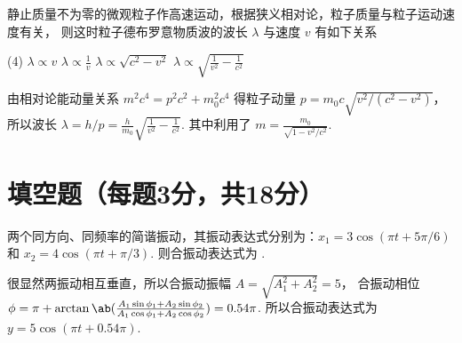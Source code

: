 \documentclass[quiet]{ctexart}
\begin{document}
\begin{problem}
  静止质量不为零的微观粒子作高速运动，根据狭义相对论，粒子质量与粒子运动速度有关，
  则这时粒子德布罗意物质波的波长 $\lambda$ 与速度 $v$ 有如下关系
  \begin{tasks}(4)
    \task $\lambda \propto v$
    \task $\lambda \propto \frac1v$
    \task $\lambda \propto \sqrt{c^2 - v^2}$
    \task[\true] $\lambda \propto \sqrt{\frac1{v^2} - \frac1{c^2}}$
  \end{tasks}
\end{problem}
\begin{solution}
  由相对论能动量关系 $m^2c^4 = p^2c^2 + m_0^2c^4$ 得粒子动量
  $p = m_0c \sqrt{v^2/(c^2 - v^2)}$，所以波长
  $\lambda = h/p = \frac{h}{m_0} \sqrt{\frac1{v^2} - \frac1{c^2}}$.
  其中利用了 $m = \frac{m_0}{\sqrt{1 - v^2/c^2}}$.
\end{solution}

\section{填空题（每题3分，共18分）}

\begin{problem}
  两个同方向、同频率的简谐振动，其振动表达式分别为：$x_1 = 3\cos(\pi t + 5\pi/6)$ 和
  $x_2 = 4\cos(\pi t + \pi/3)$. 则合振动表达式为 .
\end{problem}
\begin{solution}
  很显然两振动相互垂直，所以合振动振幅 $A = \sqrt{A_1^2 + A_2^2} = 5$，
  合振动相位
  $ \phi = \pi + \arctan\ab(\frac{A_1\sin\phi_1 + A_2\sin\phi_2}
    {A_1\cos\phi_1 + A_2\cos\phi_2}) = 0.54\pi$. 所以合振动表达式为
  $y = 5\cos(\pi t + 0.54\pi)$.
\end{solution}
\end{document}
